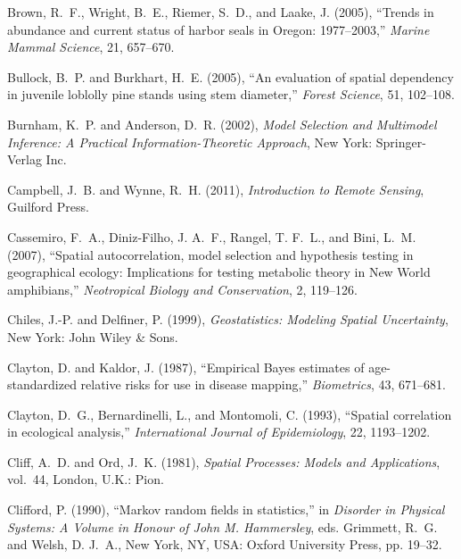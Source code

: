 \documentclass[11pt, titlepage]{article}\usepackage[]{graphicx}\usepackage[]{color}
\begin{document}
\begin{spacing}{1.9}
\begin{flushleft}
\begin{thebibliography}{126}
Brown, R.~F., Wright, B.~E., Riemer, S.~D., and Laake, J. (2005),
  \enquote{Trends in abundance and current status of harbor seals in Oregon:
  1977--2003,} \textit{Marine Mammal Science}, 21, 657--670.

Bullock, B.~P. and Burkhart, H.~E. (2005), \enquote{An evaluation of spatial
  dependency in juvenile loblolly pine stands using stem diameter,}
  \textit{Forest Science}, 51, 102--108.

Burnham, K.~P. and Anderson, D.~R. (2002), \textit{Model Selection and
  Multimodel Inference: A Practical Information-Theoretic Approach}, New York:
  Springer-Verlag Inc.

Campbell, J.~B. and Wynne, R.~H. (2011), \textit{Introduction to Remote
  Sensing}, Guilford Press.

Cassemiro, F.~A., Diniz-Filho, J. A.~F., Rangel, T. F.~L., and Bini, L.~M.
  (2007), \enquote{Spatial autocorrelation, model selection and hypothesis
  testing in geographical ecology: Implications for testing metabolic theory in
  New World amphibians,} \textit{Neotropical Biology and Conservation}, 2,
  119--126.

Chiles, J.-P. and Delfiner, P. (1999), \textit{Geostatistics: Modeling Spatial
  Uncertainty}, New York: John Wiley \& Sons.

Clayton, D. and Kaldor, J. (1987), \enquote{Empirical Bayes estimates of
  age-standardized relative risks for use in disease mapping,}
  \textit{Biometrics}, 43, 671--681.

Clayton, D.~G., Bernardinelli, L., and Montomoli, C. (1993), \enquote{Spatial
  correlation in ecological analysis,} \textit{International Journal of
  Epidemiology}, 22, 1193--1202.

Cliff, A.~D. and Ord, J.~K. (1981), \textit{Spatial Processes: Models and
  Applications}, vol.~44, London, U.K.: Pion.

Clifford, P. (1990), \enquote{Markov random fields in statistics,} in
  \textit{Disorder in Physical Systems: A Volume in Honour of John M.
  Hammersley}, eds. Grimmett, R.~G. and Welsh, D. J.~A., New York, NY, USA:
  Oxford University Press, pp. 19--32.


\end{thebibliography}
\end{flushleft}
\end{spacing}
\end{document}

